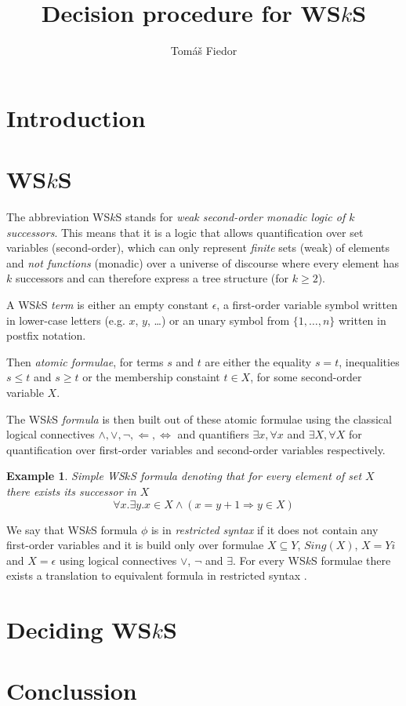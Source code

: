 \documentclass{eeict}
\title{Decision procedure for WS$k$S}
\author{Tomáš Fiedor}
\newtheorem{example}{Example}[section]
\begin{document}
\maketitle

\section{Introduction}

\section{WS$k$S}

The abbreviation WS$k$S stands for \emph{weak second-order monadic logic of $k$
successors}. This means that it is a logic that allows quantification over set
variables (second-order), which can only represent \emph{finite} sets (weak) of
elements and \emph{not functions} (monadic) over a universe of discourse where
every element has $k$ successors and can therefore express a tree structure
(for $k \geq 2$).

A WS$k$S \emph{term} is either an empty constant $\epsilon$, a first-order
variable symbol written in lower-case letters (e.g. $x$, $y$, \ldots) or an
unary symbol from $\{1,\ldots,n\}$ written in postfix notation. 

Then \emph{atomic formulae}, for terms $s$ and $t$ are either the equality $s =
t$, inequalities $s \leq t$ and $s \geq t$ or the membership constaint $t \in
X$, for some second-order variable $X$.

The WS$k$S \emph{formula} is then built out of these atomic formulae using the
classical logical connectives $\wedge, \vee, \neg, \Leftarrow, \Leftrightarrow$
and quantifiers $\exists x, \forall x$ and $\exists X, \forall X$ for
quantification over first-order variables and second-order variables
respectively.

\begin{example} Simple WS$k$S formula denoting that for every element of set $X$
there exists its successor in $X$ $$ \forall x. \exists y. x \in X \wedge (x = y
+ 1 \Rightarrow y \in X) $$
\end{example}

We say that WS$k$S formula $\phi$ is in \emph{restricted syntax} if it does not
contain any first-order variables and it is build only over formulae $X
\subseteq Y$, $Sing(X)$, $X = Yi$ and $X = \epsilon$ using logical connectives
$\vee$, $\neg$ and $\exists$. For every WS$k$S formulae there exists a
translation to equivalent formula in restricted syntax \cite{tata}.

\section{Deciding WS$k$S}

\section{Conclussion}

%
\begin{thebibliography}{9}
\end{thebibliography}
\end{document}
